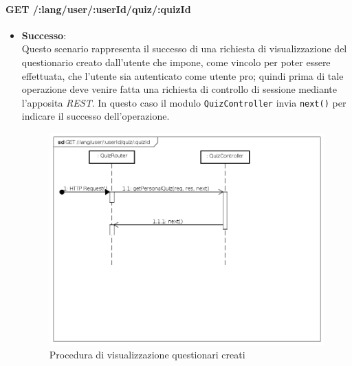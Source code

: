 \paragraph{GET /:lang/user/:userId/quiz/:quizId} %
\begin{itemize}
\item \textbf{Successo}:\\
Questo scenario rappresenta il successo di una richiesta di visualizzazione del questionario creato dall'utente che impone, come vincolo per poter essere effettuata, che l'utente sia autenticato come utente pro; quindi prima di tale operazione deve venire fatta una richiesta di controllo di sessione mediante l'apposita \textit{REST}. In questo caso il modulo \texttt{QuizController} invia \texttt{next()} per indicare il successo dell'operazione.
\label{Procedura di visualizzazione questionario creato}
\begin{figure}[ht]
	\centering
	\includegraphics[scale=0.40]{UML/DiagrammiDiSequenza/Back-end/GET__lang_user_userId_quiz_quizId_success.png}
	\caption{Procedura di visualizzazione questionari creati}
\end{figure}
\FloatBarrier


\end{itemize}
